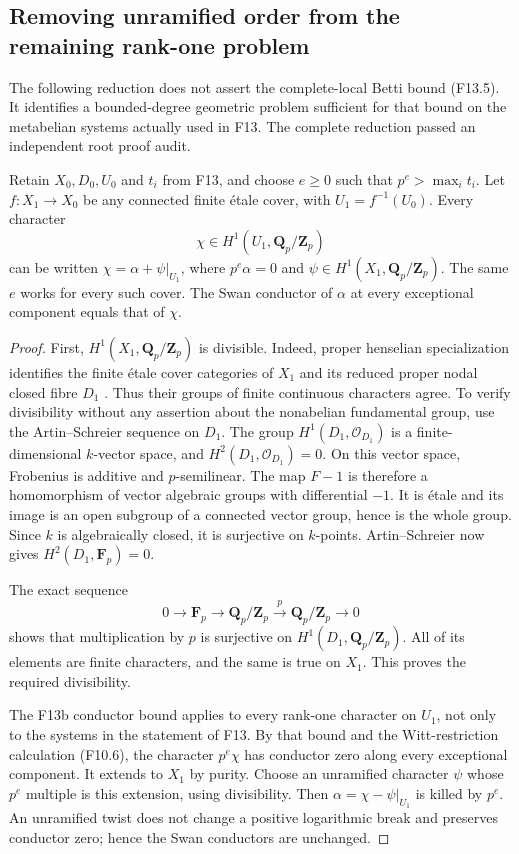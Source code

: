 \subsection{Removing unramified order from the remaining rank-one problem}

The following reduction does not assert the complete-local Betti bound
(F13.5). It identifies a bounded-degree geometric problem sufficient for
that bound on the metabelian systems actually used in F13. The
complete reduction passed an independent root proof audit.

\begin{lemma}
Retain $X_0,D_0,U_0$ and $t_i$ from F13, and choose $e\geq0$
such that $p^e>\max_i t_i$. Let $f:X_1\to X_0$ be any connected
finite \'etale cover, with $U_1=f^{-1}(U_0)$. Every character
\[
 \chi\in H^1(U_1,\mathbf Q_p/\mathbf Z_p)
\]
can be written $\chi=\alpha+\psi|_{U_1}$, where
$p^e\alpha=0$ and $\psi\in H^1(X_1,\mathbf Q_p/\mathbf Z_p)$.
The same $e$ works for every such cover. The Swan conductor of
$\alpha$ at every exceptional component equals that of $\chi$.
\end{lemma}
\begin{proof}
First, $H^1(X_1,\mathbf Q_p/\mathbf Z_p)$ is divisible. Indeed,
proper henselian specialization identifies the finite \'etale cover
categories of $X_1$ and its reduced proper nodal closed fibre $D_1$
\cite[Lemma 58.9.1, tag 0A48]{StacksProperEtaleSpecialization}.
Thus their groups of finite continuous characters agree. To verify
divisibility without any assertion about the nonabelian fundamental
group, use the Artin--Schreier sequence on $D_1$. The group
$H^1(D_1,\mathcal O_{D_1})$ is a finite-dimensional $k$-vector space,
and $H^2(D_1,\mathcal O_{D_1})=0$. On this vector space, Frobenius
is additive and $p$-semilinear. The map $F-1$ is therefore a
homomorphism of vector algebraic groups with differential $-1$.
It is \'etale and its image is an open subgroup of a connected
vector group, hence is the whole group. Since $k$ is algebraically
closed, it is surjective on $k$-points. Artin--Schreier now gives
$H^2(D_1,\mathbf F_p)=0$.

The exact sequence
\[
 0\longrightarrow\mathbf F_p\longrightarrow
 \mathbf Q_p/\mathbf Z_p\xrightarrow{p}
 \mathbf Q_p/\mathbf Z_p\longrightarrow0
\]
shows that multiplication by $p$ is surjective on
$H^1(D_1,\mathbf Q_p/\mathbf Z_p)$. All of its elements are finite
characters, and the same is true on $X_1$. This proves the required
divisibility.

The F13b conductor bound applies to every rank-one character on
$U_1$, not only to the systems in the statement of F13.
By that bound and the Witt-restriction calculation (F10.6), the character
$p^e\chi$ has conductor zero along every exceptional component.
It extends to $X_1$ by purity. Choose an unramified character
$\psi$ whose $p^e$ multiple is this extension, using divisibility.
Then $\alpha=\chi-\psi|_{U_1}$ is killed by $p^e$. An unramified
twist does not change a positive logarithmic break and preserves
conductor zero; hence the Swan conductors are unchanged.
\end{proof}

